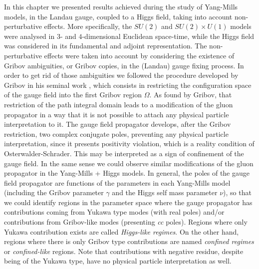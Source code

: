 In this chapter we presented results achieved during the study of Yang-Mills models, in the
Landau gauge, coupled to a Higgs field, taking into account non-perturbative effects. More
specifically, the $SU(2)$ and $SU(2)\times U(1)$ models were analysed in $3$- and
$4$-dimensional Euclidean space-time, while the Higgs field was considered in its fundamental
and adjoint representation. The non-perturbative effects were taken into account by considering
the existence of Gribov ambiguities, or Gribov copies, in the (Landau) gauge fixing process. In
order to get rid of those ambiguities we followed the procedure developed by Gribov in his
seminal work \cite{Gribov:1977wm}, which consists in restricting the configuration space of the
gauge field into the first Gribov region $\Omega$. As found by Gribov, that restriction of the
path integral domain leads to a modification of the gluon propagator in a way that it is not
possible to attach any physical particle interpretation to it. The gauge field
propagator develops, after the Gribov restriction, two complex conjugate poles, preventing
any physical particle interpretation, since it presents positivity violation, which is a
reality condition of Osterwalder-Schrader. This may be interpreted as a sign of confinement of
the gauge field. In the same sense we could observe similar modifications of the gluon
propagator in the Yang-Mills + Higgs models. In general, the poles of the gauge field
propagator are functions of the parameters in each Yang-Mills model (including the Gribov
parameter $\gamma$ and the Higgs self mass parameter $\nu$), so that we could identify regions
in the parameter space where the gauge propagator has contributions coming from Yukawa type
modes (with real poles) and/or contributions from Gribov-like modes (presenting {\it cc}
poles). Regions where only Yukawa contribution exists are called {\it Higgs-like regimes}. On
the other hand, regions where there is only Gribov type contributions are named {\it confined
regimes} or {\it confined-like} regions. Note that contributions with negative residue, despite
being of the Yukawa type, have no physical particle interpretation as well.


